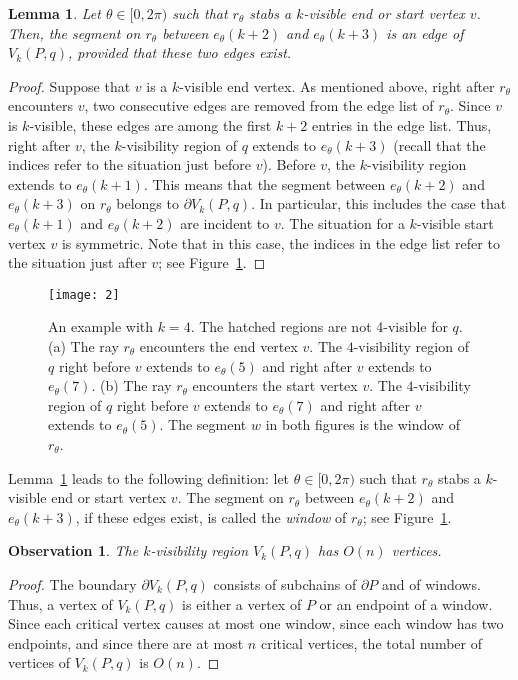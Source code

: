 \documentclass[11pt, a4paper]{article}
\newtheorem{lem}[theorem1]{Lemma}{\bfseries}{\itshape}
\newtheorem{obs}[theorem1]{Observation}{\bfseries}{\itshape}
\begin{document}
\begin{lem}\label{lem:window}
Let $\theta \in [0, 2\pi)$ such that 
$r_{\theta}$ stabs a $k$-visible end or start vertex $v$. Then, the 
segment on $r_{\theta}$ between $e_{\theta}(k+2)$ and 
$e_{\theta}(k+3)$ is an edge of $V_k(P,q)$,
provided that these two edges exist.
\end{lem}
\begin{proof}
Suppose that $v$ is a $k$-visible end vertex. 
As mentioned above, right after $r_\theta$ encounters
$v$, two consecutive edges are removed from the
edge list of $r_\theta$.
Since $v$ is $k$-visible, these edges are among
the first $k+2$ entries in the edge list.
Thus, right after $v$, the $k$-visibility region of $q$ extends
to $e_\theta(k+3)$ (recall that the indices refer to
the situation just before $v$). Before $v$, the
$k$-visibility region extends to $e_\theta(k+1)$.
This means that the segment between $e_\theta(k+2)$ and $e_\theta(k+3)$
on $r_\theta$ belongs to 
$\partial V_k(P,q)$. In particular, this includes the case that
$e_\theta(k+1)$ and $e_\theta(k+2)$ are incident to $v$.
The situation for a $k$-visible start vertex $v$ is symmetric. 
Note that in this case, the indices in the edge list refer 
to the situation just after $v$; see Figure~\ref{fig:fig2}.
\end{proof}

\begin{figure}
 \centering 
 \texttt{[image: 2]}
\caption{An example with $k = 4$. 
The hatched regions are not 4-visible for $q$.
(a) The ray $r_\theta$ encounters the end vertex $v$.
The $4$-visibility region of $q$ right before $v$
extends to $e_\theta(5)$ and right after $v$ extends to $e_\theta(7)$.
(b) The ray $r_\theta$ encounters the start vertex $v$.
The $4$-visibility region of $q$ right before $v$
extends to $e_\theta(7)$ and right after $v$ extends to $e_\theta(5)$.
The segment $w$ in both figures is the window of $r_\theta$.}
\label{fig:fig2}
\end{figure}


Lemma~\ref{lem:window} leads to the following definition: 
let $\theta \in [0, 2\pi)$ such that
$r_\theta$ stabs a $k$-visible end or start
vertex $v$. The segment on $r_\theta$ between 
$e_{\theta}(k+2)$ and 
$e_{\theta}(k+3)$, if these edges exist, is called the \emph{window} 
of $r_{\theta}$; see Figure~\ref{fig:fig2}.

\begin{obs}\label{obs:complexity}
The $k$-visibility region $V_k(P,q)$ has $O(n)$ vertices.
\end{obs}
\begin{proof}
The boundary $\partial V_k(P,q)$ consists of subchains  
of $\partial P$ and of windows. Thus, a vertex of $V_k(P,q)$ is 
either a vertex of $P$ or an endpoint of a window. Since each 
critical vertex causes at most one window, since each
window has two endpoints, and since there are at most $n$ critical 
vertices, the total number of 
vertices of $V_k(P,q)$ is $O(n)$.
\end{proof}
\end{document}
